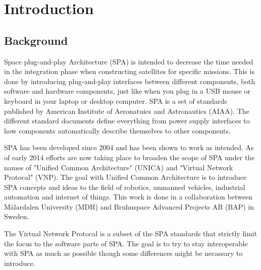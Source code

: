 \chapter{Introduction}

\section{Background}


Space plug-and-play Architecture (SPA) is intended to decrease the time needed in
the integration phase when constructing satellites for specific missions. This
is done by introducing plug-and-play interfaces between different components,
both software and hardware components, just like when you plug in a USB mouse
or keyboard in your laptop or desktop computer. SPA is a set of standards
published by American Institute of Aeronatuics and Astronautics (AIAA). The
different standard documents define everything from power supply interfaces to
how components automatically describe themselves to other components.


SPA has been developed since 2004 and has been shown to work as intended. As of
early 2014 efforts are now taking place to broaden the scope of SPA under the
names of "Unified Common Architecture" (UNICA) and "Virtual Network Protocal"
(VNP). The goal with Unified Common Architecture is to introduce SPA concepts
and ideas to the field of robotics, unmanned vehicles, industrial automation
and internet of things. This work is done in a collaboration between
M\"{a}lardalen University (MDH) and Bruhnspace Advanced Projects AB (BAP) in
Sweden.


The Virtual Network Protocal is a subset of the SPA standards that
strictly limit the focus to the software parts of SPA. The goal is to try to
stay interoperable with SPA as much as possible though some differences might
be necassary to introduce.

